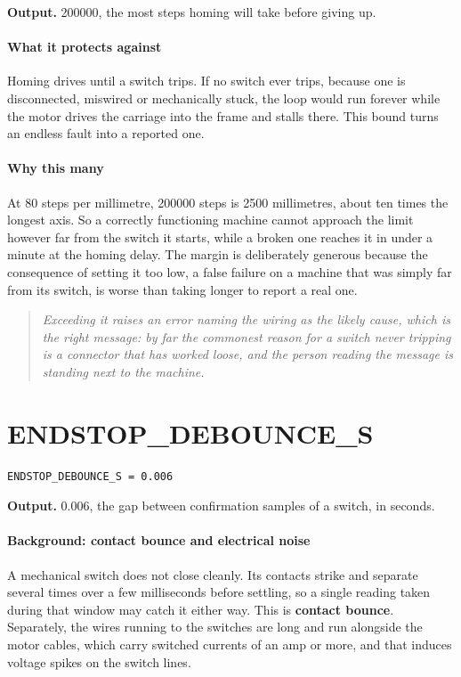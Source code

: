 \noindent\textbf{Output.} 200000, the most steps homing will take before giving up.


\paragraph{What it protects against}
Homing drives until a switch trips. If no switch ever trips, because one is disconnected, miswired or mechanically stuck, the loop would run forever while the motor drives the carriage into the frame and stalls there. This bound turns an endless fault into a reported one.


\paragraph{Why this many}
At 80 steps per millimetre, 200000 steps is 2500 millimetres, about ten times the longest axis. So a correctly functioning machine cannot approach the limit however far from the switch it starts, while a broken one reaches it in under a minute at the homing delay. The margin is deliberately generous because the consequence of setting it too low, a false failure on a machine that was simply far from its switch, is worse than taking longer to report a real one.


\begin{quote}\small\itshape Exceeding it raises an error naming the wiring as the likely cause, which is the right message: by far the commonest reason for a switch never tripping is a connector that has worked loose, and the person reading the message is standing next to the machine.\end{quote}

\section{ENDSTOP\_DEBOUNCE\_S}
\begin{lstlisting}[style=sig]
ENDSTOP_DEBOUNCE_S = 0.006
\end{lstlisting}

\noindent\textbf{Output.} 0.006, the gap between confirmation samples of a switch, in seconds.


\paragraph{Background: contact bounce and electrical noise}
A mechanical switch does not close cleanly. Its contacts strike and separate several times over a few milliseconds before settling, so a single reading taken during that window may catch it either way. This is \textbf{contact bounce}. Separately, the wires running to the switches are long and run alongside the motor cables, which carry switched currents of an amp or more, and that induces voltage spikes on the switch lines.


